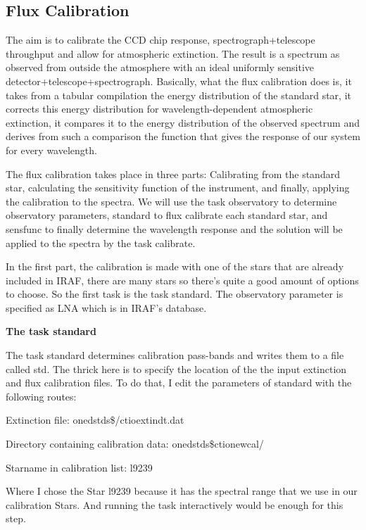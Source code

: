 \subsection{Flux Calibration}

The aim is to calibrate the CCD chip response, spectrograph+telescope throughput and allow for atmospheric extinction. The result is a spectrum as observed from outside the atmosphere with an ideal uniformly sensitive detector+telescope+spectrograph. Basically, what the flux calibration does is, it takes from a tabular compilation the energy distribution of the standard star, it corrects this energy distribution for wavelength-dependent atmospheric extinction, it compares it to the energy distribution of the observed spectrum and derives from such a comparison the function that gives the response of our system for every wavelength.

The flux calibration takes place in three parts: Calibrating from the standard star, calculating the sensitivity function of the instrument, and finally, applying the calibration to the spectra. We will use the task observatory to determine observatory parameters, standard to flux calibrate each standard star, and sensfunc to finally determine the wavelength response and the solution will be applied to the spectra by the task calibrate.

In the first part, the calibration is made with one of the stars that are already included in IRAF, there are many stars so there's quite a good amount of options to choose. So the first task is the task standard. The observatory parameter is specified as LNA which is in IRAF's database. 

\textbf{The task standard}

The task standard determines calibration pass-bands and writes them to a file called std. The thrick here is to specify the location of the the input extinction and flux calibration files. To do that, I edit the parameters of standard with the following routes:

Extinction file:                              onedstds\$/ctioextindt.dat

Directory containing calibration data:   onedstds\$ctionewcal/

Starname in calibration list:                l9239

Where I chose the Star l9239 because it has the spectral range that we use in our calibration Stars. And running the task interactively would be enough for this step.

